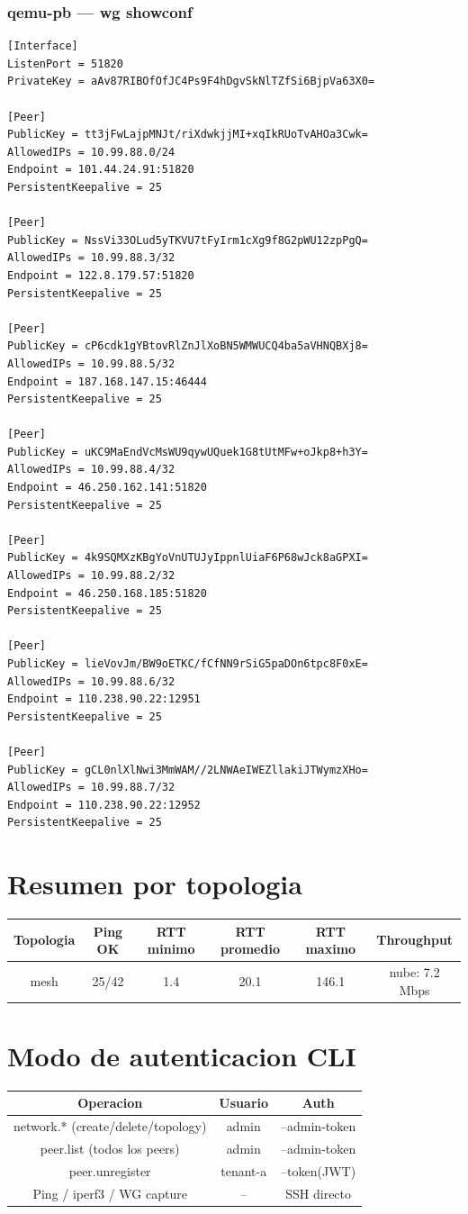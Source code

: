 \documentclass[11pt,a4paper]{article}
\begin{document}
\subsubsection*{qemu-pb — wg showconf}
\begin{lstlisting}
[Interface]
ListenPort = 51820
PrivateKey = aAv87RIBOfOfJC4Ps9F4hDgvSkNlTZfSi6BjpVa63X0=

[Peer]
PublicKey = tt3jFwLajpMNJt/riXdwkjjMI+xqIkRUoTvAHOa3Cwk=
AllowedIPs = 10.99.88.0/24
Endpoint = 101.44.24.91:51820
PersistentKeepalive = 25

[Peer]
PublicKey = NssVi33OLud5yTKVU7tFyIrm1cXg9f8G2pWU12zpPgQ=
AllowedIPs = 10.99.88.3/32
Endpoint = 122.8.179.57:51820
PersistentKeepalive = 25

[Peer]
PublicKey = cP6cdk1gYBtovRlZnJlXoBN5WMWUCQ4ba5aVHNQBXj8=
AllowedIPs = 10.99.88.5/32
Endpoint = 187.168.147.15:46444
PersistentKeepalive = 25

[Peer]
PublicKey = uKC9MaEndVcMsWU9qywUQuek1G8tUtMFw+oJkp8+h3Y=
AllowedIPs = 10.99.88.4/32
Endpoint = 46.250.162.141:51820
PersistentKeepalive = 25

[Peer]
PublicKey = 4k9SQMXzKBgYoVnUTUJyIppnlUiaF6P68wJck8aGPXI=
AllowedIPs = 10.99.88.2/32
Endpoint = 46.250.168.185:51820
PersistentKeepalive = 25

[Peer]
PublicKey = lieVovJm/BW9oETKC/fCfNN9rSiG5paDOn6tpc8F0xE=
AllowedIPs = 10.99.88.6/32
Endpoint = 110.238.90.22:12951
PersistentKeepalive = 25

[Peer]
PublicKey = gCL0nlXlNwi3MmWAM//2LNWAeIWEZllakiJTWymzXHo=
AllowedIPs = 10.99.88.7/32
Endpoint = 110.238.90.22:12952
PersistentKeepalive = 25

\end{lstlisting}

\section{Resumen por topologia}
\begin{longtable}{|c|c|c|c|c|c|}
\hline
Topologia & Ping OK & RTT minimo & RTT promedio & RTT maximo & Throughput \\ \hline
mesh & 25/42 & 1.4 & 20.1 & 146.1 & nube: 7.2 Mbps \\ \hline
\end{longtable}

\section{Modo de autenticacion CLI}
\begin{longtable}{|c|c|c|}
\hline
Operacion & Usuario & Auth \\ \hline
network.* (create/delete/topology) & admin & --admin-token \\ \hline
peer.list (todos los peers) & admin & --admin-token \\ \hline
peer.unregister & tenant-a & --token(JWT) \\ \hline
Ping / iperf3 / WG capture & -- & SSH directo \\ \hline
\end{longtable}
\end{document}
